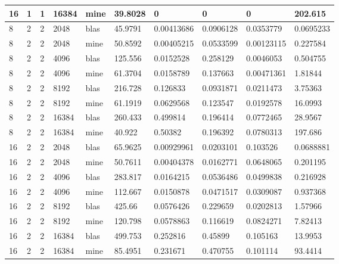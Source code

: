 \documentclass{article}
\begin{document}
\begin{table}[h]
{\begin{tabular}{|l|l|l|l|l|l|l|l|l|l|}
16      & 1         & 1     & 16384 & mine & 39.8028 & 0           & 0          & 0           & 202.615   \\ \hline
8       & 2         & 2     & 2048  & blas & 45.9791 & 0.00413686  & 0.0906128  & 0.0353779   & 0.0695233 \\ \hline
8       & 2         & 2     & 2048  & mine & 50.8592 & 0.00405215  & 0.0533599  & 0.00123115  & 0.227584  \\ \hline
8       & 2         & 2     & 4096  & blas & 125.556 & 0.0152528   & 0.258129   & 0.0046053   & 0.504755  \\ \hline
8       & 2         & 2     & 4096  & mine & 61.3704 & 0.0158789   & 0.137663   & 0.00471361  & 1.81844   \\ \hline
8       & 2         & 2     & 8192  & blas & 216.728 & 0.126833    & 0.0931871  & 0.0211473   & 3.75363   \\ \hline
8       & 2         & 2     & 8192  & mine & 61.1919 & 0.0629568   & 0.123547   & 0.0192578   & 16.0993   \\ \hline
8       & 2         & 2     & 16384 & blas & 260.433 & 0.499814    & 0.196414   & 0.0772465   & 28.9567   \\ \hline
8       & 2         & 2     & 16384 & mine & 40.922  & 0.50382     & 0.196392   & 0.0780313   & 197.686   \\ \hline
16      & 2         & 2     & 2048  & blas & 65.9625 & 0.00929961  & 0.0203101  & 0.103526    & 0.0688881 \\ \hline
16      & 2         & 2     & 2048  & mine & 50.7611 & 0.00404378  & 0.0162771  & 0.0648065   & 0.201195  \\ \hline
16      & 2         & 2     & 4096  & blas & 283.817 & 0.0164215   & 0.0536486  & 0.0499838   & 0.216928  \\ \hline
16      & 2         & 2     & 4096  & mine & 112.667 & 0.0150878   & 0.0471517  & 0.0309087   & 0.937368  \\ \hline
16      & 2         & 2     & 8192  & blas & 425.66  & 0.0576426   & 0.229659   & 0.0202813   & 1.57966   \\ \hline
16      & 2         & 2     & 8192  & mine & 120.798 & 0.0578863   & 0.116619   & 0.0824271   & 7.82413   \\ \hline
16      & 2         & 2     & 16384 & blas & 499.753 & 0.252816    & 0.45899    & 0.105163    & 13.9953   \\ \hline
16      & 2         & 2     & 16384 & mine & 85.4951 & 0.231671    & 0.470755   & 0.101114    & 93.4414   \\ \hline
\end{tabular}%
}
\end{table}
\end{document}
